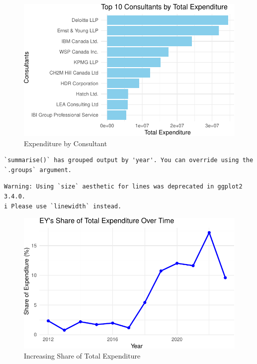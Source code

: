 \documentclass[
  letterpaper,
  DIV=11,
  numbers=noendperiod]{scrartcl}
\begin{document}
\begin{figure}[H]

{\centering \includegraphics{paper_files/figure-pdf/top-consultants-2.pdf}

}

\caption{Expenditure by Consultant}

\end{figure}%

\begin{verbatim}
`summarise()` has grouped output by 'year'. You can override using the
`.groups` argument.
\end{verbatim}

\begin{verbatim}
Warning: Using `size` aesthetic for lines was deprecated in ggplot2 3.4.0.
i Please use `linewidth` instead.
\end{verbatim}

\begin{figure}[H]

{\centering \includegraphics{paper_files/figure-pdf/increasing-share-proof-1.pdf}

}

\caption{Increasing Share of Total Expenditure}

\end{figure}%
\end{document}
